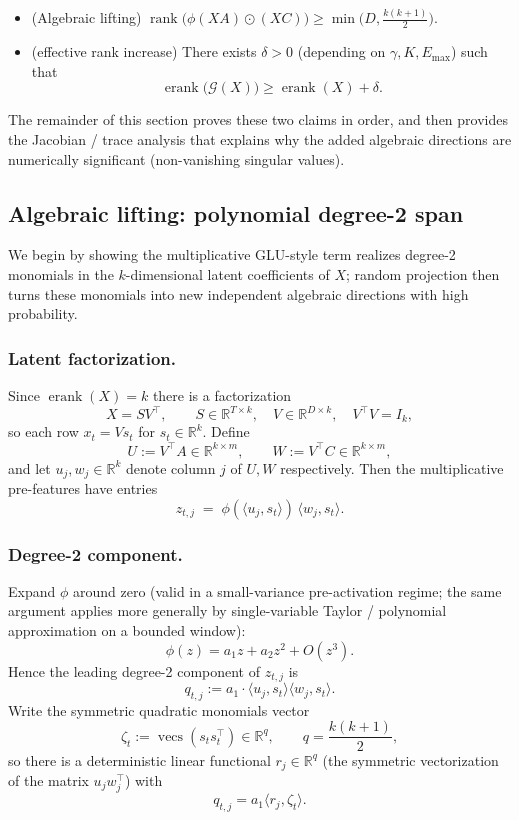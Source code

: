 \documentclass[sigconf,screen]{acmart}
\begin{document}
\begin{itemize}[leftmargin=15pt,parsep=2pt,itemsep=2pt,topsep=2pt]
  \item (Algebraic lifting) \(\operatorname{rank}\!\big(\phi(XA)\odot (XC)\big)\ge \min\!\big(D,\tfrac{k(k+1)}{2}\big)\).
  \item (effective rank increase) There exists \(\delta>0\) (depending on \(\gamma,K,E_{\max}\)) such that
  \[
  \operatorname{erank}\big(\mathcal G(X)\big)\ge \operatorname{erank}(X) + \delta.
  \]
\end{itemize}

The remainder of this section proves these two claims in order, and then provides the Jacobian / trace analysis that explains why the added algebraic directions are numerically significant (non-vanishing singular values).

\subsection{Algebraic lifting: polynomial degree-2 span}
\label{app:geglu_lifting}

We begin by showing the multiplicative GLU-style term realizes degree-2 monomials in the \(k\)-dimensional latent coefficients of \(X\); random projection then turns these monomials into new independent algebraic directions with high probability.

\subsubsection*{\bf Latent factorization.} Since \(\operatorname{erank}(X)=k\) there is a factorization
\[
X = S V^\top,
\qquad S\in\mathbb R^{T\times k},\quad V\in\mathbb R^{D\times k},\quad V^\top V=I_k,
\]
so each row \(x_t = V s_t\) for \(s_t\in\mathbb R^k\). Define
\[
U := V^\top A \in\mathbb R^{k\times m},\qquad W := V^\top C \in\mathbb R^{k\times m},
\]
and let \(u_j,w_j\in\mathbb R^k\) denote column \(j\) of \(U,W\) respectively. Then the multiplicative pre-features have entries
\[
z_{t,j} \;=\; \phi(\langle u_j, s_t\rangle)\,\langle w_j, s_t\rangle.
\]

\subsubsection*{\bf Degree-2 component.} Expand \(\phi\) around zero (valid in a small-variance pre-activation regime; the same argument applies more generally by single-variable Taylor / polynomial approximation on a bounded window):
\[
\phi(z) = a_1 z + a_2 z^2 + O(z^3).
\]
Hence the leading degree-2 component of \(z_{t,j}\) is
\[
q_{t,j} := a_1\cdot \langle u_j,s_t\rangle\langle w_j,s_t\rangle.
\]
Write the symmetric quadratic monomials vector
\[
\zeta_t := \operatorname{vecs}(s_t s_t^\top)\in\mathbb R^{q},\qquad q = \frac{k(k+1)}{2},
\]
so there is a deterministic linear functional \(r_j\in\mathbb R^q\) (the symmetric vectorization of the matrix \(u_j w_j^\top\)) with
\[
q_{t,j} = a_1 \langle r_j,\zeta_t\rangle.
\]
\end{document}

